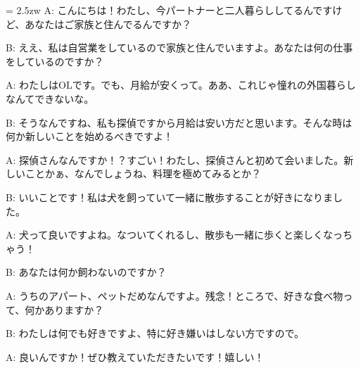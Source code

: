 \documentclass[11pt]{amsart}
\title{}
\author{}
\newenvironment{hangall}[1]{\hangindent = 2.5zw\everypar{\hangindent = 2.5zw}}{}
\begin{document}
\maketitle
\begin{hangall}{}%
A: こんにちは！わたし、今パートナーと二人暮らししてるんですけど、あなたはご家族と住んでるんですか？



B: ええ、私は自営業をしているので家族と住んでいますよ。あなたは何の仕事をしているのですか？



A: わたしはOLです。でも、月給が安くって。ああ、これじゃ憧れの外国暮らしなんてできないな。



B: そうなんですね、私も探偵ですから月給は安い方だと思います。そんな時は何か新しいことを始めるべきですよ！



A: 探偵さんなんですか！？すごい！わたし、探偵さんと初めて会いました。新しいことかぁ、なんでしょうね、料理を極めてみるとか？



B: いいことです！私は犬を飼っていて一緒に散歩することが好きになりました。



A: 犬って良いですよね。なついてくれるし、散歩も一緒に歩くと楽しくなっちゃう！



B: あなたは何か飼わないのですか？



A: うちのアパート、ペットだめなんですよ。残念！ところで、好きな食べ物って、何かありますか？



B: わたしは何でも好きですよ、特に好き嫌いはしない方ですので。



A: 良いんですか！ぜひ教えていただきたいです！嬉しい！\end{hangall}
\end{document}
